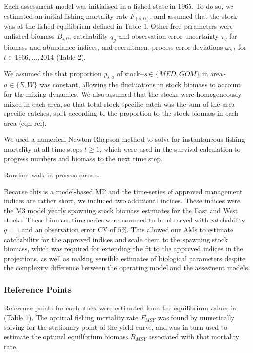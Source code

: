 \documentclass[]{article}
\begin{document}
Each assessment model was initialised in a fished state in 1965. To do so,
we estimated an initial fishing mortality rate \(F_(s,0)\), and assumed
that the stock was at the fished equilibrium defined in Table 1. Other free
parameters were unfished biomass \(B_{s,0}\), catchability \(q_g\) and
observation error uncertainty \(\tau_g\) for biomass and abundance indices,
and recruitment process error deviations \(\omega_{s,t}\) for
\(t \in 1966,..., 2014\) (Table 2).

We assumed the that proportion \(p_{s,a}\) of
stock\textasciitilde{}\(s \in \{MED,GOM\}\) in area\textasciitilde{}\(a \in \{E,W\}\) was
constant, allowing the fluctuations in stock biomass to
account for the mixing dynamics. We also assumed that the stocks
were homogeneously mixed in each area, so that total stock specific
catch was the sum of the area specific catches, split according
to the proportion to the stock biomass in each area (eqn ref).

We used a numerical Newton-Rhapson method to solve for instantaneous
fishing mortality at all time steps \(t \geq 1\), which were used in
the survival calculation to progress numbers and biomass to the
next time step.

Random walk in process errors\ldots{}

Because this is a model-based MP and the time-series of approved
management indices are rather short, we included two additional indices.
These indices were the M3 model yearly spawning stock biomass estimates
for the East and West stocks. These biomass time series were assumed to be
observed with catchability \(q = 1\) and an observation error
CV of \(5 \%\). This allowed our AMs to estimate catchability for the
approved indices and scale them to the spawning stock biomass, which was
required for extending the fit to the approved indices in the projections,
as well as making sensible estimates of biological parameters despite the
complexity difference between the operating model and the assesment
models.

\hypertarget{reference-points}{%
\subsubsection{Reference Points}\label{reference-points}}

Reference points for each stock were estimated from the equilibrium
values in (Table 1). The optimal fishing mortality rate \(F_{MSY}\)
was found by numerically solving for the stationary point of the yield
curve, and was in turn used to estimate the optimal equilibrium
biomass \(B_{MSY}\) associated with that mortality rate.
\end{document}
